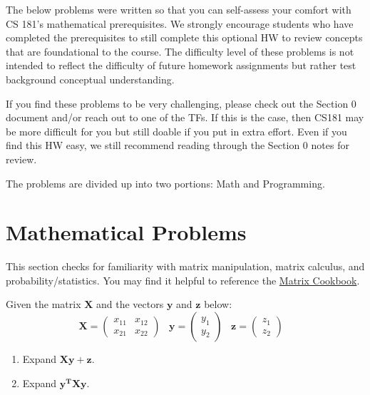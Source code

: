 \documentclass{harvardml}
\theoremstyle{definition}
\theoremstyle{plain}
\begin{document}
The below problems were written so that you can self-assess your comfort with CS 181's mathematical prerequisites.  We strongly encourage students who have completed the prerequisites to still complete this optional HW to review concepts that are foundational to the course.  The difficulty level of these problems is not intended to reflect the difficulty of future homework assignments but rather test background conceptual understanding.

If you find these problems to be very challenging, please check out the Section 0 document and/or reach out to one of the TFs. If this is the case, then CS181 may be more difficult for you but still doable if you put in extra effort. Even if you find this HW easy, we still recommend reading through the Section 0 notes for review.

The problems are divided up into two portions: Math and Programming.

\section{Mathematical Problems}
This section checks for familiarity with matrix manipulation, matrix calculus, and probability/statistics. You may find it helpful to reference the \href{https://www.math.uwaterloo.ca/~hwolkowi/matrixcookbook.pdf}{Matrix Cookbook}. \\

\begin{problem}
		    Given the matrix $\mathbf{X}$ and the vectors $\mathbf{y}$ and $\mathbf{z}$  below:
		    \begin{equation*}
		        \mathbf{X} = \begin{pmatrix}
		        x_{11} & x_{12}\\
		        x_{21} & x_{22}
		        \end{pmatrix} \hspace{10pt} \mathbf{y} = \begin{pmatrix} y_{1} \\ y_{2} \end{pmatrix} \hspace{10pt} \mathbf{z} = \begin{pmatrix} z_{1} \\ z_{2} \end{pmatrix} \hspace{10pt} 
		    \end{equation*}  
		    \begin{enumerate}[label=(\alph*)]
		        \item Expand $\mathbf{X}\mathbf{y} + \mathbf{z}$.
		        
		        \item Expand $\mathbf{y^T}\mathbf{X}\mathbf{y}$.

		    \end{enumerate}
		\end{problem}
\end{document}
